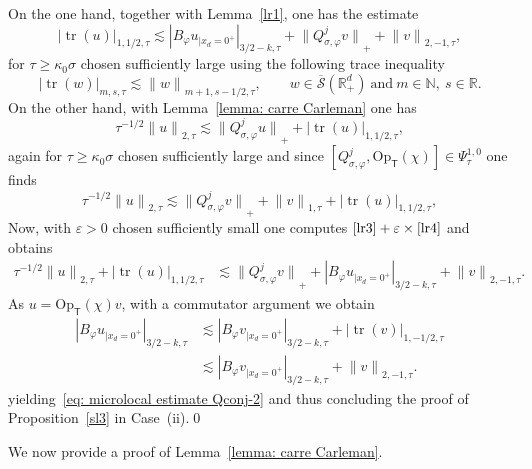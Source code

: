 \documentclass[JEP,XML,SOM,Unicode,published]{cedram}
\theoremstyle{plain}
\theoremstyle{definition}
\def\R{\mathbb{R}}
\def\N{\mathbb{N}}
\newcommand{\suff}{sufficiently\xspace}
\let\k\kappa
\newcommand{\br}{\ensuremath{_{|x_d=0^+}}}
\newcommand{\Opt}{\ensuremath{\mathrm{Op}_{\scriptscriptstyle{\mathsf{T}}}}}
\newcommand{\Norm}[2]{{\| #1 \|}_{#2}}
\newcommand{\Normsc}[2]{{\| #1 \|}_{#2, \tau}}
\newcommand{\normsc}[2]{{| #1 |}_{#2, \tau}}
\newcommand{\bignormsc}[2]{{\big| #1 \big|}_{#2, \tau}}
\newcommand{\Psisc}{\Psi_\tau}
\newcommand{\Qconj}{Q_{\sigma,\varphi}}
\newcommand{\Sbarp}{\ensuremath{\overline{\mathscr{S}}(\Rdp)}}
\newcommand{\Rdp}{\R^d_+}
\DeclareMathOperator{\trace}{tr}
\begin{document}
On the one hand, together with Lemma~\ref{lr1}, one has the estimate
\begin{equation}\label{lr3}
\bignormsc{\trace (u)}{1,1/2}
\lesssim
\normsc{B_{\varphi}u\br}{3/2-k}
+ \Norm{\Qconj^jv}{+}
+\Normsc{v}{2,-1},
\end{equation}
for $\tau \geq \k_0 \sigma$ chosen \suff large
using the following trace inequality
\begin{equation*}
\normsc{\trace(w)}{m,s}
\lesssim \Normsc{w}{m+1,s-1/2},
\qquad w\in \Sbarp \ \text{and} \ m\in\N, \
s\in\R.
\end{equation*}
On the other hand, with Lemma~\ref{lemma: carre Carleman} one has
\begin{equation*}
\tau^{-1/2} \Normsc{u}{2}
\lesssim
\Norm{\Qconj^j u}{+} + \normsc{\trace(u)}{1,1/2},
\end{equation*}
again for $\tau \geq \k_0 \sigma$ chosen \suff large
and since $[\Qconj^j, \Opt(\chi)]\in \Psisc^{1,0}$ one finds
\begin{equation}
\label{lr4}
\tau^{-1/2} \Normsc{u}{2}
\lesssim
\Norm{\Qconj^j v}{+} + \Normsc{v}{1} + \normsc{\trace(u)}{1,1/2},
\end{equation}
Now, with $\varepsilon>0$ chosen \suff small one computes $\eqref{lr3}
+ \varepsilon\times\eqref{lr4}$ and obtains
\begin{align*}
\tau^{-1/2} \Normsc{u}{2}
+ \normsc{\trace(u)}{1,1/2}
&\lesssim
\Norm{\Qconj^j v}{+}
+ \normsc{B_{\varphi}u\br}{3/2-k}
+\Normsc{v}{2,-1}.
\end{align*}
As $u=\Opt(\chi)v$, with a commutator argument we obtain
\begin{align*}
\normsc{B_{\varphi}u\br}{3/2-k}
& \lesssim
\normsc{B_{\varphi}v\br}{3/2-k}
+ \normsc{\trace(v)}{1,-1/2}\\
& \lesssim
\normsc{B_{\varphi}v\br}{3/2-k}
+ \Normsc{v}{2,-1}.
\end{align*}
yielding~\eqref{eq: microlocal estimate Qconj-2} and thus concluding the proof of
Proposition~\ref{sl3} in Case~(ii).\qed

\medskip

We now provide a proof of Lemma~\ref{lemma: carre Carleman}.
\end{document}
